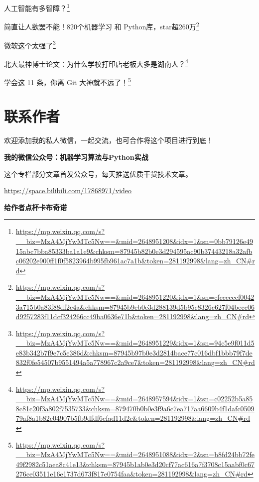 \documentclass[]{ctexbook}
\renewcommand{\href}[2]{#2\footnote{\url{#1}}}
\begin{document}
\href{https://mp.weixin.qq.com/s?__biz=MzA4MjYwMTc5Nw==\&mid=2648951208\&idx=1\&sn=0bb79126e4915abc7bba85333ba1a1e9\&chksm=87945b82b0e3d294595ac90b37443218a32afbc06202e900ff1f0f5823964b995fb961ac7a1b\&token=281192998\&lang=zh_CN\#rd}{人工智能有多智障？}

\href{https://mp.weixin.qq.com/s?__biz=MzA4MjYwMTc5Nw==\&mid=2648951220\&idx=1\&sn=cfececccf00423a715b0a83f88df2e4a\&chksm=87945b9eb0e3d288139d5b95c8326c627f04becc06d9257283f11dcf324266cc49ba0636e71b\&token=281192998\&lang=zh_CN\#rd}{简直让人欲罢不能！820个机器学习 和 Python库，star超260万}

\href{https://mp.weixin.qq.com/s?__biz=MzA4MjYwMTc5Nw==\&mid=2648951229\&idx=1\&sn=94c5e9f011d5e83b342b7f9e7c5e386d\&chksm=87945b97b0e3d2814bace77c016dbf1bbb79f7de832f0fe54507b9551494a5a778967c2a9ce7\&token=281192998\&lang=zh_CN\#rd}{微软这个太强了}

\href{https://mp.weixin.qq.com/s?__biz=MzA4MjYwMTc5Nw==\&mid=2648957594\&idx=1\&sn=c02252b5a858c81c20f3a802f7535733\&chksm=879470b0b0e3f9a6c7ea717aa6609b4f1dafc050979af8a1b82c04907b5fb9dfdf6efad11d2c\&token=281192998\&lang=zh_CN\#rd}{北大最神博士论文：为什么学校打印店老板大多是湖南人？}

\href{https://mp.weixin.qq.com/s?__biz=MzA4MjYwMTc5Nw==\&mid=2648951088\&idx=2\&sn=b8fd24bb72fe49f2982c51aea8c41e13\&chksm=87945b1ab0e3d20cf77ac616a7f3708c15aabf0c67276ce03511e16e1737d673f817e0754faa\&token=281192998\&lang=zh_CN\#rd}{学会这 11 条，你离 Git 大神就不远了！}

\hypertarget{ux8054ux7cfbux4f5cux8005}{%
\chapter{联系作者}\label{ux8054ux7cfbux4f5cux8005}}

欢迎添加我的私人微信，一起交流，也可合作将这个项目进行到底！

\textbf{我的微信公众号：机器学习算法与Python实战}

这个专栏部分文章首发公众号，每天推送优质干货技术文章。

\url{https://space.bilibili.com/17868971/video}

\textbf{给作者点杯卡布奇诺}



\backmatter
\printindex
\end{document}
